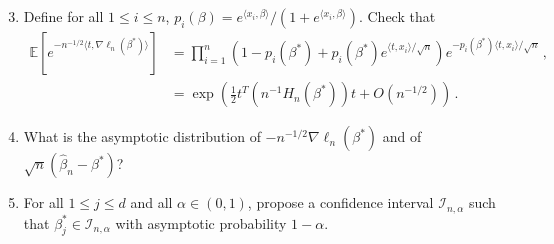 \documentclass[a4paper,10pt,fleqn]{article}
\newcommand{\eqsp}{\,}
\newcommand{\calF}{\mathcal{F}}
\newcommand{\rset}{\ensuremath{\mathbb{R}}}
\newcommand{\xset}{\ensuremath{\mathsf{X}}}
\newcommand{\1}{\ensuremath{\mathbbm{1}}}
\newcommand{\bE}{\mathbb{E}}
\begin{document}
\begin{enumerate}  \setcounter{enumi}{2}
\item Define for all $1\leqslant i \leqslant n$, $p_{i}(\beta)=e^{\langle x_{i},\beta\rangle}/ \left(1+e^{\langle x_{i},\beta\rangle}\right)$. Check that
\begin{align*}
\bE \left[e^{-n^{-1/2}\langle t,\nabla\ell_{n}(\beta^*)\rangle}\right]& =\prod_{i=1}^n \left({1-p_{i}(\beta^*)+p_{i}(\beta^*)e^{\langle t,x_{i}\rangle/\sqrt{n}}}\right) e^{-p_{i}(\beta^*)\langle t,x_{i}\rangle/\sqrt{n}}\eqsp, \\
&=\exp\left(\frac{1}{2}t^T\left(n^{-1}H_{n}(\beta^*)\right)t+O(n^{-1/2})\right)\eqsp.
\end{align*}
\item What is the asymptotic distribution of $-n^{-1/2}\nabla\ell_{n}(\beta^*)$ and of $\sqrt{n}(\widehat \beta_n-\beta^*)$?
\item For all $1\leqslant j \leqslant d$ and all $\alpha\in(0,1)$, propose a confidence interval $\mathcal{I}_{n,\alpha}$ such that $\beta^*_{j}\in \mathcal{I}_{n,\alpha}$ with asymptotic probability $1-\alpha$.
\end{enumerate}

\clearpage
\newpage
%
%
%
%
%
%
%
\end{document}
